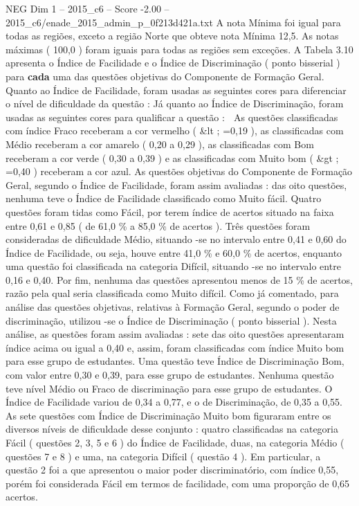 \begin{textsample}{NEG Dim 1 – 2015\_c6 – Score -2.00 – 2015\_c6/enade\_2015\_admin\_p\_0f213d421a.txt}
A nota Mínima foi igual para todas as regiões, exceto a região Norte que obteve nota Mínima 12,5.
As notas máximas ( 100,0 ) foram iguais para todas as regiões sem exceções.
A Tabela 3.10 apresenta o Índice de Facilidade e o Índice de Discriminação ( ponto bisserial ) para \textbf{cada} uma das questões objetivas do Componente de Formação Geral.
Quanto ao Índice de Facilidade, foram usadas as seguintes cores para diferenciar o nível de dificuldade da questão : Já quanto ao Índice de Discriminação, foram usadas as seguintes cores para qualificar a questão :  As questões classificadas com índice Fraco receberam a cor vermelho ( \&lt ; =0,19 ), as classificadas com Médio receberam a cor amarelo ( 0,20 a 0,29 ), as classificadas com Bom receberam a cor verde ( 0,30 a 0,39 ) e as classificadas com Muito bom ( \&gt ; =0,40 ) receberam a cor azul.
As questões objetivas do Componente de Formação Geral, segundo o Índice de Facilidade, foram assim avaliadas : das oito questões, nenhuma teve o Índice de Facilidade classificado como Muito fácil.
Quatro questões foram tidas como Fácil, por terem índice de acertos situado na faixa entre 0,61 e 0,85 ( de 61,0 \% a 85,0 \% de acertos ).
Três questões foram consideradas de dificuldade Médio, situando -se no intervalo entre 0,41 e 0,60 do Índice de Facilidade, ou seja, houve entre 41,0 \% e 60,0 \% de acertos, enquanto uma questão foi classificada na categoria Difícil, situando -se no intervalo entre 0,16 e 0,40.
Por fim, nenhuma das questões apresentou menos de 15 \% de acertos, razão pela qual seria classificada como Muito difícil.
Como já comentado, para análise das questões objetivas, relativas à Formação Geral, segundo o poder de discriminação, utilizou -se o Índice de Discriminação ( ponto bisserial ).
Nesta análise, as questões foram assim avaliadas : sete das oito questões apresentaram índice acima ou igual a 0,40 e, assim, foram classificadas com índice Muito bom para esse grupo de estudantes.
Uma questão teve Índice de Discriminação Bom, com valor entre 0,30 e 0,39, para esse grupo de estudantes.
Nenhuma questão teve nível Médio ou Fraco de discriminação para esse grupo de estudantes.
O Índice de Facilidade variou de 0,34 a 0,77, e o de Discriminação, de 0,35 a 0,55.
As sete questões com Índice de Discriminação Muito bom figuraram entre os diversos níveis de dificuldade desse conjunto : quatro classificadas na categoria Fácil ( questões 2, 3, 5 e 6 ) do Índice de Facilidade, duas, na categoria Médio ( questões 7 e 8 ) e uma, na categoria Difícil ( questão 4 ).
Em particular, a questão 2 foi a que apresentou o maior poder discriminatório, com índice 0,55, porém foi considerada Fácil em termos de facilidade, com uma proporção de 0,65 acertos.

\end{textsample}
